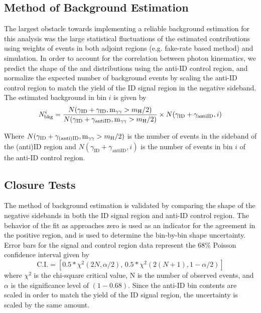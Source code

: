 \subsection{Method of Background Estimation} \label{sec:ana_bkgest}
The largest obstacle towards implementing a reliable background estimation for this analysis was the large statistical fluctuations of the estimated contributions using weights of events in both adjoint regions (e.g. fake-rate based method) and simulation. In order to account for the correlation between photon kinematics, we predict the shape of the \lxy and \mgg distributions using the anti-ID control region, and normalize the expected number of background events by scaling the anti-ID control region to match the yield of the ID signal region in the negative \lxy sideband. The estimated background in bin $i$ is given by
\begin{equation}
	\label{eq:background}
	N_{\mathrm{bkg}}^{i} = \frac{N(\gamma_\mathrm{ID}+\gamma_\mathrm{ID}, \text{m}_{\gamma\gamma} > m_{\mathrm{H}}\space/2)}{N(\gamma_\mathrm{ID}+\gamma_\mathrm{antiID}, \text{m}_{\gamma\gamma} > m_{\mathrm{H}}\space/2)}\times N(\gamma_\mathrm{ID}+\gamma_\mathrm{antiID}, i)
\end{equation}

Where $N(\gamma_\mathrm{ID}+\gamma_\mathrm{(anti)ID}, \text{m}_{\gamma\gamma} > m_{\mathrm{H}}\space/2)$ is the number of events in the \lxy sideband of the (anti)ID region and $N(\gamma_\mathrm{ID}+\gamma_\mathrm{antiID}, i)$ is the number of events in bin $i$ of the anti-ID control region. 

\subsection{Closure Tests} \label{sec:ana_bkgclosure}
The method of background estimation is validated by comparing the shape of the negative \lxy sidebands in both the ID signal region and anti-ID control region. The behavior of the fit as \lxy approaches zero is used as an indicator for the agreement in the positive \lxy region, and is used to determine the bin-by-bin shape uncertainty. Error bars for the signal and control region data represent the $68\%$ Poisson confidence interval given by
\begin{equation}
	\text{C.I.}=\left[0.5*\chi^2(2N, \alpha/2),\, 0.5*\chi^2(2(N+1), 1-\alpha/2)\right]
\end{equation}
where $\chi^2$ is the chi-square critical value, N is the number of observed events, and $\alpha$ is the significance level of $(1-0.68)$. Since the anti-ID bin contents are scaled in order to match the yield of the ID signal region, the uncertainty is scaled by the same amount.

